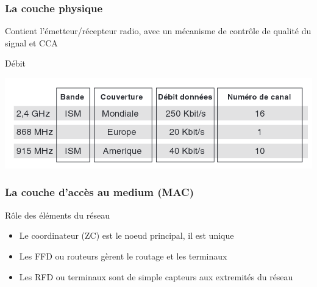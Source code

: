 \documentclass{beamer}
\begin{document}
  \begin{frame}
    \frametitle{La couche physique}
    Contient l'émetteur/récepteur radio, avec un mécanisme de contrôle de qualité du signal et CCA
    \begin{block}{Débit}
      \begin{center}
       \includegraphics[scale=0.25]{Vitesse-Zigbee.png}
      \end{center}
    \end{block}
  \end{frame}
  
  \begin{frame}
    \frametitle{La couche d'accès au medium (MAC)}
    \begin{block}{Rôle des éléments du réseau}
      \begin{itemize}
        \item Le coordinateur (ZC) est le noeud principal, il est unique
        \item Les FFD ou routeurs gèrent le routage et les terminaux
        \item Les RFD ou terminaux sont de simple capteurs aux extremités du réseau
      \end{itemize}
    \end{block}
  \end{frame}
  
\end{document}
